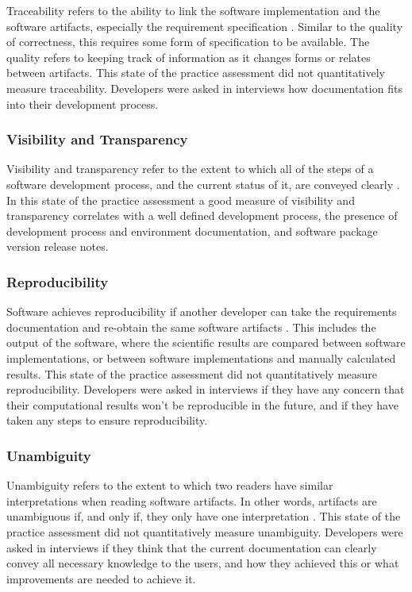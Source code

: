 \documentclass[12pt, notitlepage]{article}
\begin{document}
Traceability refers to the ability to link the software implementation and the software artifacts, especially the requirement specification \citep{McCallEtAl1977}. Similar to the quality of correctness, this requires some form of specification to be available. The quality refers to keeping track of information as it changes forms or relates between artifacts. This state of the practice assessment did not quantitatively measure traceability. Developers were asked in interviews how documentation fits into their development process.

\subsubsection{Visibility and Transparency}

Visibility and transparency refer to the extent to which all of the steps of a software development process, and the current status of it, are conveyed clearly \citep{ghezzi1991fundamentals}. In this state of the practice assessment a good measure of visibility and transparency correlates with a well defined development process, the presence of development process and environment documentation, and software package version release notes. 

\subsubsection{Reproducibility}

Software achieves reproducibility if another developer can take the requirements documentation and re-obtain the same software artifacts \citep{BenureauAndRougier2017}. This includes the output of the software, where the scientific results are compared between software implementations, or between software implementations and manually calculated results. This state of the practice assessment did not quantitatively measure reproducibility. Developers were asked in interviews if they have any concern that their computational results won't be reproducible in the future, and if they have taken any steps to ensure reproducibility.

\subsubsection{Unambiguity}

Unambiguity refers to the extent to which two readers have similar interpretations when reading software artifacts. In other words, artifacts are unambiguous if, and only if, they only have one interpretation \citep{IEEE1998}. This state of the practice assessment did not quantitatively measure unambiguity. Developers were asked in interviews if they think that the current documentation can clearly convey all necessary knowledge to the users, and how they achieved this or what improvements are needed to achieve it.
\end{document}

